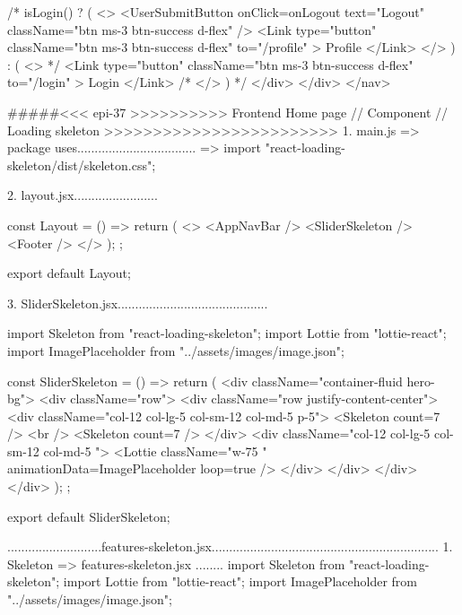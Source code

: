             {/*  {isLogin() ? (
              <>
                <UserSubmitButton
                  onClick={onLogout}
                  text="Logout"
                  className="btn ms-3 btn-success d-flex"
                />
                <Link
                  type="button"
                  className="btn ms-3 btn-success d-flex"
                  to="/profile"
                >
                  Profile
                </Link>
              </>
            ) : (
              <> */}
            <Link
              type="button"
              className="btn ms-3 btn-success d-flex"
              to="/login"
            >
              Login
            </Link>
            {/*   </>
            )} */}
          </div>
        </div>
      </nav>



#####<<< epi-37 >>>>>>>>>> Frontend Home page // Component  // Loading skeleton >>>>>>>>>>>>>>>>>>>>>>>>
1. main.js  => package uses..................................
   => import "react-loading-skeleton/dist/skeleton.css";

2. layout.jsx........................

const Layout = () => {
  return (
    <>
      <AppNavBar />
      <SliderSkeleton />
      <Footer />
    </>
  );
};

export default Layout;

3. SliderSkeleton.jsx...........................................

import Skeleton from "react-loading-skeleton";
import Lottie from "lottie-react";
import ImagePlaceholder from "../assets/images/image.json";

const SliderSkeleton = () => {
  return (
    <div className="container-fluid hero-bg">
      <div className="row">
        <div className="row justify-content-center">
          <div className="col-12 col-lg-5 col-sm-12 col-md-5 p-5">
            <Skeleton count={7} />
            <br />
            <Skeleton count={7} />
          </div>
          <div className="col-12  col-lg-5 col-sm-12 col-md-5  ">
            <Lottie
              className="w-75 "
              animationData={ImagePlaceholder}
              loop={true}
            />
          </div>
        </div>
      </div>
    </div>
  );
};

export default SliderSkeleton;


...........................features-skeleton.jsx.................................................................
1. Skeleton => features-skeleton.jsx ........
import Skeleton from "react-loading-skeleton";
import Lottie from "lottie-react";
import ImagePlaceholder from "../assets/images/image.json";

